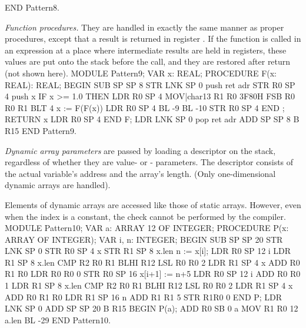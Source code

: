 END Pattern8.
\endtt

\noindent {} \emph{Function procedures.} They are handled in exactly the same manner as proper procedures, except that a result is returned in register . If the function is called in an expression at a place where intermediate results are held in registers, these values are put onto the stack before the call, and they are restored after return (not shown here).
\begintt
MODULE Pattern9;
  VAR x: REAL;
  PROCEDURE F(x: REAL): REAL;
  BEGIN                SUB  SP SP 8
                       STR  LNK SP 0      push ret adr
                       STR  R0 SP 4       push x
    IF x >= 1.0 THEN   LDR  R0 SP 4
                       MOV|char13 R1 R0 3F80H
                       FSB  R0 R0 R1
                       BLT  4
      x := F(F(x))     LDR  R0 SP 4
                       BL   -9
                       BL   -10
                       STR  R0 SP 4
    END ;                                
    RETURN x           LDR  R0 SP 4
  END F;               LDR  LNK SP 0      pop ret adr
                       ADD  SP SP 8
                       B    R15
END Pattern9.
\endtt

\noindent {} \emph{Dynamic array parameters} are passed by loading a descriptor on the stack, regardless of whether they are value- or - parameters. The descriptor consists of the actual variable's address and the array's length. (Only one-dimensional dynamic arrays are handled).

Elements of dynamic arrays are accessed like those of static arrays. However, even when the index is a constant, the check cannot be performed by the compiler.
\begintt
MODULE Pattern10;
  VAR a: ARRAY 12 OF INTEGER;
  PROCEDURE P(x: ARRAY OF INTEGER);
    VAR i, n: INTEGER;
  BEGIN               SUB  SP SP 20
                      STR  LNK SP 0
                      STR  R0 SP 4    x
                      STR  R1 SP 8    x.len
    n := x[i];        LDR  R0 SP 12   i
                      LDR  R1 SP 8    x.len
                      CMP  R2 R0 R1
                      BLHI R12
                      LSL  R0 R0 2
                      LDR  R1 SP 4    x
                      ADD  R0 R1 R0
                      LDR  R0 R0 0
                      STR  R0 SP 16
    x[i+1] := n+5     LDR  R0 SP 12   i
                      ADD  R0 R0 1
                      LDR  R1 SP 8    x.len
                      CMP  R2 R0 R1
                      BLHI R12
                      LSL  R0 R0 2
                      LDR  R1 SP 4    x
                      ADD  R0 R1 R0
                      LDR  R1 SP 16   n
                      ADD  R1 R1 5
                      STR  R1R0 0
  END P;              LDR  LNK SP 0
                      ADD  SP SP 20
                      B    R15
  BEGIN P(a);         ADD  R0 SB 0    a
                      MOV  R1 R0 12   a.len
                      BL   -29
END Pattern10.
\endtt

